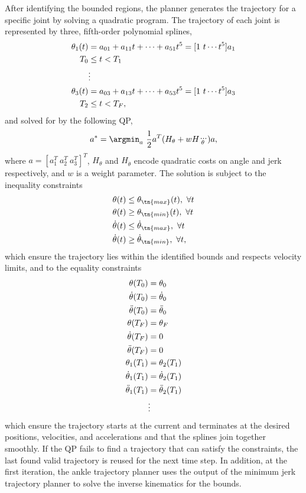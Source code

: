 After identifying the bounded regions, the planner generates the trajectory for
a specific joint by solving a quadratic program. The trajectory of each joint is
represented by three, fifth-order polynomial splines,
\begin{align}
    \theta_1(t) &= a_{01} + a_{11} t + \cdots + a_{51} t^5 
        = [1 \ t \cdots t^5] a_1 \\ 
        T_0 &\le t < T_1 \\
    &\vdots \notag \\
    \theta_3(t) &= a_{03} + a_{13} t + \cdots + a_{53} t^5 
        = [1 \ t \cdots t^5] a_3 \\ 
     T_2 &\le t < T_F,
\end{align}
and solved for by the following QP,
\begin{align}
    a^* = \argmin_a \ \frac{1}{2} a^T (H_\theta + w H_{\dddot{\theta}}) a
    \label{eq:quadprog},
\end{align}
where $a = [a_1^T \ a_2^T \ a_3^T]^T$, $H_\theta$ and $H_{\dddot{\theta}}$
encode quadratic costs on angle and jerk respectively, and $w$ is a weight
parameter. The solution is subject to the inequality constraints
\begin{align}
    \theta(t) &\le \theta_\tn{max}(t), \ \forall t\\
    \theta(t) &\ge \theta_\tn{min}(t), \ \forall t\\
    \dot{\theta}(t) &\le \dot{\theta}_\tn{max}, \ \forall t\\
    \dot{\theta}(t) &\ge \dot{\theta}_\tn{min}, \ \forall t,
\end{align}
which ensure the trajectory lies within the identified bounds and respects
velocity limits, and to the equality constraints
\begin{align}
\theta(T_0) &= \theta_0 \\
\dot{\theta}(T_0) &= \dot{\theta}_0 \\
\ddot{\theta}(T_0) &= \ddot{\theta}_0 \\
\theta(T_F) &= \theta_F \\
\dot{\theta}(T_F) &= 0 \\
\ddot{\theta}(T_F) &= 0 \\
\theta_1(T_1) &= \theta_2(T_1) \\
\dot{\theta}_1(T_1) &= \dot{\theta}_2(T_1) \\
\ddot{\theta}_1(T_1) &= \ddot{\theta}_2(T_1) 
\label{eq:quadprog_last_constraint} \\
&\vdots \notag
\end{align}
which ensure the trajectory starts at the current and terminates at the desired
positions, velocities, and accelerations and that the splines join together
smoothly.  If the QP fails to find a trajectory that can satisfy the
constraints, the last found valid trajectory is reused for the next time step.
In addition, at the first iteration, the ankle trajectory planner uses the
output of the minimum jerk trajectory planner to solve the inverse kinematics
for the bounds. 

